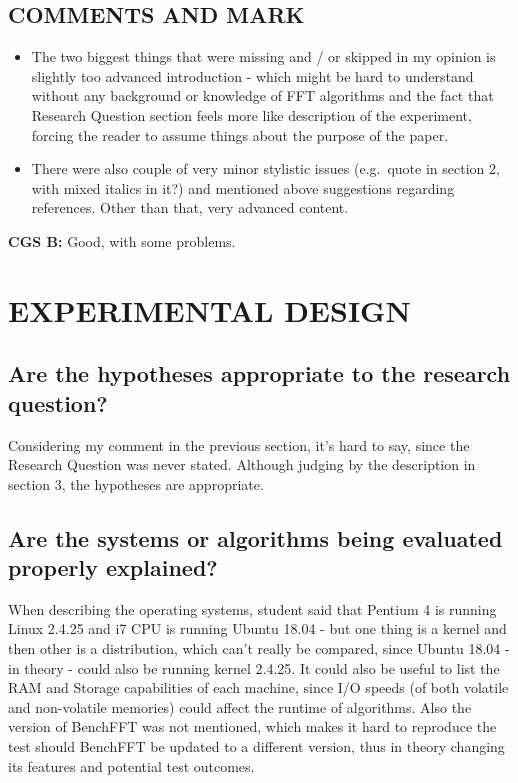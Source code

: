 \documentclass{article}
\begin{document}
\begin{normalsize}
 \subsection{COMMENTS AND MARK} 
 \begin{itemize}
   \item The two biggest things that were missing and / or skipped in my opinion is slightly too advanced introduction - which might be hard to understand without any background or knowledge of FFT algorithms and the fact that Research Question section feels more like description of the experiment, forcing the reader to assume things about the purpose of the paper.
   \item There were also couple of very minor stylistic issues (e.g.\ quote in section 2, with mixed italics in it?) and mentioned above suggestions regarding references.
Other than that, very advanced content.
\end{itemize}
\textbf{CGS B:}
Good, with some problems.

\section{EXPERIMENTAL DESIGN}
\subsection{Are the hypotheses appropriate to the research question?}
Considering my comment in the previous section, it's hard to say, since the Research Question was never stated. Although judging by the description in section 3, the hypotheses are appropriate. 
\subsection{Are the systems or algorithms being evaluated properly explained?}
When describing the operating systems, student said that Pentium 4 is running Linux 2.4.25 and i7 CPU is running Ubuntu 18.04 - but one thing is a kernel and then other is a distribution, which can't really be compared, since Ubuntu 18.04 - in theory - could also be running kernel 2.4.25.
\bigbreak\noindent
It could also be useful to list the RAM and Storage capabilities of each machine, since I/O speeds (of both volatile and non-volatile memories) could affect the runtime of algorithms.
\bigbreak\noindent
Also the version of BenchFFT was not mentioned, which makes it hard to reproduce the test should BenchFFT be updated to a different version, thus in theory changing its features and potential test outcomes.

\end{normalsize}
\end{document}
